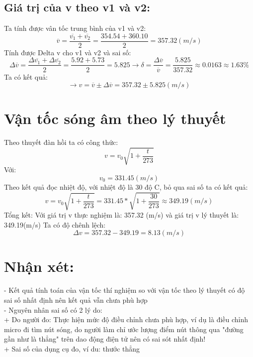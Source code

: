 \documentclass[12pt]{article}
\begin{document}
	\subsection{{\sffamily Giá trị của v theo v1 và v2:}}
	{\sffamily Ta tính được vân tốc trung bình của v1 và v2: }
	\[\overline v  = \frac{{\overline {{v_1}}  + \overline {{v_2}} }}{2} = \frac{{354.54 + 360.10}}{2} = 357.32(m/s)\]
	{\sffamily Tính được Delta v cho v1 và v2 và sai số:}
	\[\Delta \overline v  = \frac{{\Delta \overline {{v_1}}  + \Delta \overline {{v_2}} }}{2} = \frac{{5.92 + 5.73}}{2} = 5.825 \to \delta  = \frac{{\Delta \overline v }}{{\overline v }} = \frac{{5.825}}{{357.32}} \approx 0.0163 \approx 1.63\% \]
	{\sffamily Ta có kết quả:}
	\[ \to {v} = \overline {{v}}  \pm \Delta \overline {{v}}  = 357.32 \pm 5.825(m/s)\]
	\section{{\sffamily Vận tốc sóng âm theo lý thuyết}}
	{\sffamily Theo thuyết đàn hồi ta có công thức: }
	\[v = {v_0}\sqrt {1 + \frac{t}{{273}}} \]
	{{\sffamily Với:}}
	\[{v_0} = 331.45(m/s)\]
	{\sffamily Theo kết quả đọc nhiệt độ, với nhiệt độ là 30 độ C, bỏ qua sai số ta có kết quả:}
	\[v = {v_0}\sqrt {1 + \frac{t}{{273}}}  = 331.45*\sqrt {1 + \frac{{30}}{{273}}}  \approx 349.19(m/s)\]
	{{\sffamily Tổng kết: }}
	{{\sffamily Với giá trị v thực nghiệm là: 357.32 (m/s) và giá trị v lý thuyết là: 349.19(m/s)}}
	{{\sffamily Ta có độ chênh lệch:}}
	\[\Delta v = 357.32 - 349.19 = 8.13(m/s)\]
	\section{{\sffamily Nhận xét: }}
	{{\sffamily - Kết quả tính toán của vận tốc thí nghiệm so với vận tốc theo lý thuyết có độ sai số nhất định nên kết quả vẫn chưa phù hợp}}\\
	{{\sffamily - Nguyên nhân sai số có 2 lý do:}}\\
	{{\sffamily + Do người đo: Thực hiện mức độ điều chỉnh chưa phù hợp, ví dụ là điều chỉnh micro đi tìm nút sóng, do người làm chỉ ước lượng điểm nút thông qua "đường gần như là thẳng" trên dao động điện tử nên có sai sót nhất định!}}\\
	{{\sffamily + Sai số của dụng cụ đo, ví du: thước thẳng}}
	
\end{document}
